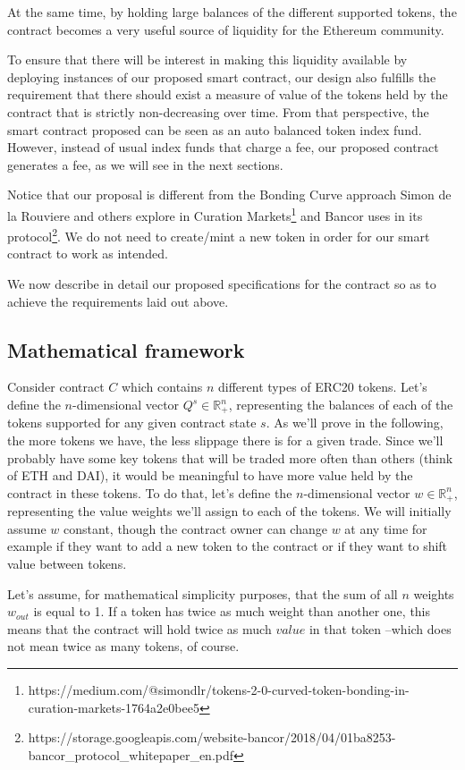 \documentclass[11pt]{amsart}
\begin{document}
At the same time, by holding large balances of the different supported tokens, the contract becomes a very useful source of liquidity for the Ethereum community. 

To ensure that there will be interest in making this liquidity available by deploying instances of our proposed smart contract, our design also fulfills the requirement that there should exist a measure of value of the tokens held by the contract that is strictly non-decreasing over time. From that perspective, the smart contract proposed can be seen as an auto balanced token index fund. However, instead of usual index funds that charge a fee, our proposed contract generates a fee, as we will see in the next sections.

Notice that our proposal is different from the Bonding Curve approach Simon de la Rouviere and others explore in Curation Markets\footnote{https://medium.com/@simondlr/tokens-2-0-curved-token-bonding-in-curation-markets-1764a2e0bee5} and Bancor uses in its protocol\footnote{https://storage.googleapis.com/website-bancor/2018/04/01ba8253-bancor\_protocol\_whitepaper\_en.pdf}. We do not need to create/mint a new token in order for our smart contract to work as intended.   

We now describe in detail our proposed specifications for the contract so as to achieve the requirements laid out above. 

\subsection{Mathematical framework}

Consider contract $C$ which contains $n$ different types of ERC20 tokens. Let's define the $n$-dimensional vector $Q^s \in \mathbb{R}_+^n$, representing the balances of each of the tokens supported for any given contract state $s$. As we'll prove in the following, the more tokens we have, the less slippage there is for a given trade. Since we'll probably have some key tokens that will be traded more often than others (think of ETH and DAI), it would be meaningful to have more value held by the contract in these tokens.  To do that, let's define the $n$-dimensional vector $w \in \mathbb{R}_+^n$, representing the value weights we'll assign to each of the tokens. We will initially assume $w$ constant, though the contract owner can change $w$ at any time for example if they want to add a new token to the contract or if they want to shift value between tokens.

Let's assume, for mathematical simplicity purposes, that the sum of all $n$ weights $w_{out}$ is equal to 1. If a token has twice as much weight than another one, this means that the contract will hold twice as much $value$ in that token --which does not mean twice as many tokens, of course.
\end{document}
